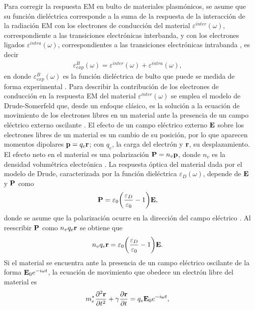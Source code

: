 Para corregir la respuesta EM  en bulto de materiales plasmónicos, se asume que su función dieléctrica corresponde a la suma de la respuesta de la interacción de la radiación EM con los electrones de conducción del material  $\varepsilon^{inter}(\omega) $, correspondiente a las transiciones electrónicas interbanda, y con los electrones ligados  $\varepsilon^{intra}(\omega) $, correspondientes a las transiciones electrónicas intrabanda \cite{noguez2007surface}, es decir
	\begin{align*}
	\varepsilon^B_{exp}(\omega) = \varepsilon^{inter}(\omega) + \varepsilon^{intra}(\omega),
	\end{align*}
en donde $\varepsilon^B_{exp}(\omega)$ es la función dieléctrica de bulto que puede se medida de forma experimental \cite{johnson1972constants}. Para describir la contribución de los electrones de conducción en la respuesta EM del material $\varepsilon^{inter}(\omega)$ se emplea el modelo de Drude-Somerfeld que, desde un enfoque clásico, es la solución a la ecuación de movimiento de los electrones libres en un material ante la presencia de un campo eléctrico externo oscilante \cite{gross2014festkorperphysik}. El efecto de un campo eléctrico externo $\vb{E}$ sobre los electrones libres de un material es un cambio de su posición, por lo que aparecen momentos dipolares $\vb{p}=q_e\vb{r}$; con $q_e$, la carga del electrón y $\vb{r}$, su desplazamiento.  El efecto neto en el material es una polarización $\vb{P} = n_v \vb{p}$, donde $n_v$ es la densidad volumétrica electrónica \cite{novotny2006principles}.  La respuesta óptica del material dada por el modelo de Drude, caracterizada por la función dieléctrica $\varepsilon_D(\omega)$, depende de $\vb{E}$ y $\vb{P}$ como 
	\begin{align*}
	\vb{P} = \varepsilon_0\qty(\frac{\varepsilon_D}{\varepsilon_0}-1)\vb{E},
	\end{align*}
donde se asume que la polarización ocurre en la dirección del campo eléctrico \cite{novotny2006principles}.  Al reescribir  $\vb{P}$ como $n_v q_e \vb{r}$ se obtiene que
	\begin{align}
	n_v q_e \vb{r} = \varepsilon_0 \qty(\frac{\varepsilon_D}{\varepsilon_0}-1)\vb{E}. 
	\label{eq:PolarizationDrude}
	\end{align}
Si el material se encuentra ante la presencia de un campo eléctrico oscilante de la forma $\vb{E}_0 e^{-i\omega t}$, la ecuación de movimiento que obedece un electrón libre del material es \cite{kreibig1995clusters,gross2014festkorperphysik}
	\begin{align}
	m_e^* \pdv[2]{\vb{r}}{t} +  \gamma \pdv{\vb{r}}{t} = q_e\vb{E}_0e^{-i\omega t},
	\label{eq:movementDrude}
	\end{align}

